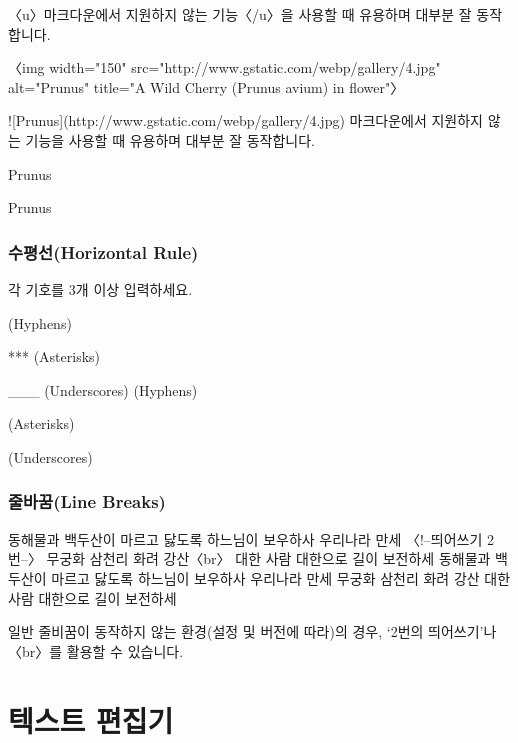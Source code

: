 \documentclass[12pt, a4paper, oneside]{book}
\let\stdsection\section
\renewcommand\section{\newpage\stdsection}
\begin{document}
					〈u〉마크다운에서 지원하지 않는 기능〈/u〉을 사용할 때 유용하며 대부분 잘 동작합니다.
					
					〈img width="150" src="http://www.gstatic.com/webp/gallery/4.jpg" alt="Prunus" title="A Wild Cherry (Prunus avium) in flower"〉
					
					![Prunus](http://www.gstatic.com/webp/gallery/4.jpg)
					마크다운에서 지원하지 않는 기능을 사용할 때 유용하며 대부분 잘 동작합니다.
					
					Prunus
					
					Prunus
				
				\section{수평선(Horizontal Rule)}
				
					각 기호를 3개 이상 입력하세요.
					
					\-\-\-
					(Hyphens)
					
					***
					(Asterisks)
					
					\_\_\_
					(Underscores)
					(Hyphens)
					
					(Asterisks)
					
					(Underscores)
				
				\section{줄바꿈(Line Breaks)}
					
					동해물과 백두산이 마르고 닳도록 
					하느님이 보우하사 우리나라 만세   〈!--띄어쓰기 2번--〉
					무궁화 삼천리 화려 강산〈br〉
					대한 사람 대한으로 길이 보전하세
					동해물과 백두산이 마르고 닳도록
					하느님이 보우하사 우리나라 만세
					무궁화 삼천리 화려 강산
					대한 사람 대한으로 길이 보전하세
					
					일반 줄비꿈이 동작하지 않는 환경(설정 및 버전에 따라)의 경우, ‘2번의 띄어쓰기’나 〈br〉를 활용할 수 있습니다.
			

	\part	{텍스트 편집기}
	\noptcrule
	\parttoc				




\end{document}
